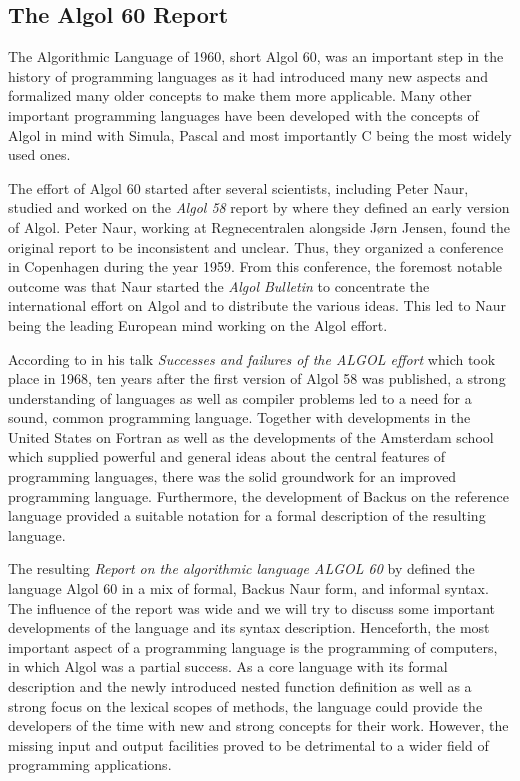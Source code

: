 \documentclass{article}
\begin{document}
\subsection{The Algol 60 Report}

The Algorithmic Language of 1960, short Algol 60, was an important step in the history of programming languages as it had introduced many new aspects and formalized many older concepts to make them more applicable. Many other important programming languages have been developed with the concepts of Algol in mind with Simula, Pascal and most importantly C being the most widely used ones.

The effort of Algol 60 started after several scientists, including Peter Naur, studied and worked on the \textit{Algol 58} report by \citet{baueralgol} where they defined an early version of Algol. Peter Naur, working at Regnecentralen alongside Jørn Jensen, found the original report to be inconsistent and unclear. Thus, they organized a conference in Copenhagen during the year 1959. From this conference, the foremost notable outcome was that Naur started the \textit{Algol Bulletin} to concentrate the international effort on Algol and to distribute the various ideas. This led to Naur being the leading European mind working on the Algol effort.

According to \citet{naur1968successes} in his talk \textit{Successes and failures of the ALGOL effort} which took place in 1968, ten years after the first version of Algol 58 was published, a strong understanding of languages as well as compiler problems led to a need for a sound, common programming language. Together with developments in the United States on Fortran as well as the developments of the Amsterdam school which supplied powerful and general ideas about the central features of programming languages, there was the solid groundwork for an improved programming language. Furthermore, the development of Backus on the reference language provided a suitable notation for a formal description of the resulting language.

The resulting \textit{Report on the algorithmic language ALGOL 60} by \citet{backus1960report} defined the language Algol 60 in a mix of formal, Backus Naur form, and informal syntax. The influence of the report was wide and we will try to discuss some important developments of the language and its syntax description. Henceforth, the most important aspect of a programming language is the programming of computers, in which Algol was a partial success. As a core language with its formal description and the newly introduced nested function definition as well as a strong focus on the lexical scopes of methods, the language could provide the developers of the time with new and strong concepts for their work. However, the missing input and output facilities proved to be detrimental to a wider field of programming applications.
\end{document}

